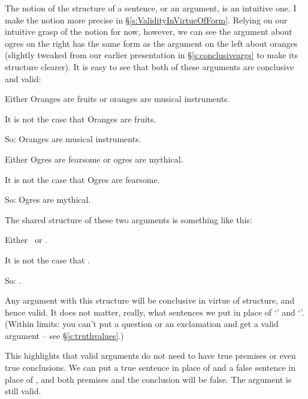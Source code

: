 The notion of the structure of a sentence, or an argument, is an intuitive one. I make the notion more precise in §\ref{s:ValidityInVirtueOfForm}. Relying on our intuitive grasp of the notion for now, however, we can see the  argument about ogres on the right has the same form as the argument on the left about oranges (slightly tweaked from our earlier presentation in §\ref{s:conclusiveargs} to make its structure clearer). It is easy to see that both of these arguments are conclusive and valid:

 \begin{minipage}{\textwidth}
	\begin{minipage}{0.47\textwidth}
		\begin{earg}
	\item[] \textsf{Either} Oranges are fruits \textsf{or} oranges are musical instruments.
	\item[] \textsf{It is not the case that} Oranges are fruits.
	\item[So:] Oranges are musical instruments.
\end{earg} 
	\end{minipage}\qquad
	\begin{minipage}{0.47\textwidth}
		\begin{earg}
	\item[] \textsf{Either} Ogres are fearsome \textsf{or} ogres are mythical.
	\item[] \textsf{It is not the case that} Ogres are fearsome.
	\item[So:] Ogres are mythical.
\end{earg}
	\end{minipage}
	\end{minipage}

The shared structure of these two arguments is something like this:
\begin{earg}
	\item[] \textsf{Either} \ \textsf{or} .
	\item[] \textsf{It is not the case that} .
	\item[So:] .
\end{earg}
Any argument with this structure will be conclusive in virtue of structure, and hence valid. It does not matter, really, what sentences we put in place of ‘’ and `'. (Within limits: you can't put a question or an exclamation and get a valid argument – see §\ref{s:truthvalues}.) 

This highlights that valid arguments do not need to have true premises or even true conclusions. We can put a true sentence in place of  and a false sentence in place of , and both premises and the conclusion will be false. The argument is still valid.



